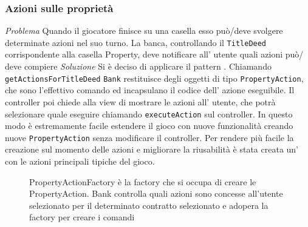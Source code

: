 \subsubsection{Azioni sulle proprietà}
\emph{Problema}\newline
Quando il giocatore finisce su una casella 
esso può/deve svolgere determinate azioni nel suo turno. 
La banca, controllando il \texttt{TitleDeed} corrispondente alla casella Property,  
deve notificare all' utente quali azioni può/ deve compiere\newline
\emph{Soluzione}\newline
Si è deciso di applicare il pattern . 
Chiamando \texttt{getActionsForTitleDeed} \texttt{Bank} 
restituisce degli oggetti di tipo \texttt{PropertyAction}, 
che sono l'effettivo comando ed incapsulano il codice dell' azione eseguibile.
Il controller poi chiede alla view di mostrare le azioni all' utente, 
che potrà selezionare quale eseguire chiamando \texttt{executeAction} sul controller.\newline 
In questo modo è estremamente facile estendere il gioco 
con nuove funzionalità creando nuove \texttt{PropertyAction} senza 
modificare il controller. 
Per rendere più facile la creazione sul momento delle azioni e 
migliorare la riusabilità è stata creata un’  
con le azioni principali tipiche del gioco.
\begin{figure}[H]
    \centering
    \caption{PropertyActionFactory è la factory che si occupa di creare le PropertyAction. Bank controlla quali azioni sono concesse all'utente selezionato
    per il determinato contratto selezionato e adopera la factory per creare i comandi}
	\label{img:PropertyAction}
\end{figure}